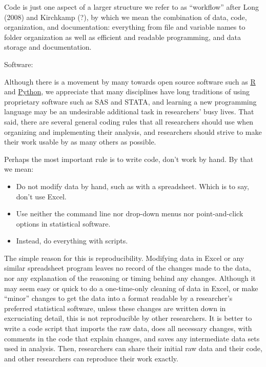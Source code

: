 \documentclass[12pt] {article}
\begin{document}
Code is just one aspect of a larger structure we refer to as
``workflow'' after Long (2008) and Kirchkamp (?), by which we mean the
combination of data, code, organization, and documentation: everything
from file and variable names to folder organization as well as efficient
and readable programming, and data storage and documentation.

Software:

Although there is a movement by many towards open source software such
as \href{http://www.r-project.org/}{R} and \href{https://www.python.org/}{Python}, we appreciate that many disciplines have long
traditions of using proprietary software such as SAS and STATA, and
learning a new programming language may be an undesirable additional
task in researchers' busy lives. That said, there are several general
coding rules that all researchers should use when organizing and
implementing their analysis, and researchers should strive to make their
work usable by as many others as possible.

Perhaps the most important rule is to write code, don't work by hand. By
that we mean:

\begin{itemize}
\item
  Do not modify data by hand, such as with a spreadsheet. Which is to
  say, don't use Excel.
\item
  Use neither the command line nor drop-down menus nor point-and-click
  options in statistical software.
\item
  Instead, do everything with scripts.
\end{itemize}

The simple reason for this is reproducibility. Modifying data in Excel
or any similar spreadsheet program leaves no record of the changes made
to the data, nor any explanation of the reasoning or timing behind any
changes. Although it may seem easy or quick to do a one-time-only
cleaning of data in Excel, or make ``minor'' changes to get the data
into a format readable by a researcher's preferred statistical software,
unless these changes are written down in excruciating detail, this is
not reproducible by other researchers. It is better to write a code
script that imports the raw data, does all necessary changes, with
comments in the code that explain changes, and saves any intermediate
data sets used in analysis. Then, researchers can share their initial
raw data and their code, and other researchers can reproduce their work
exactly.
\end{document}
